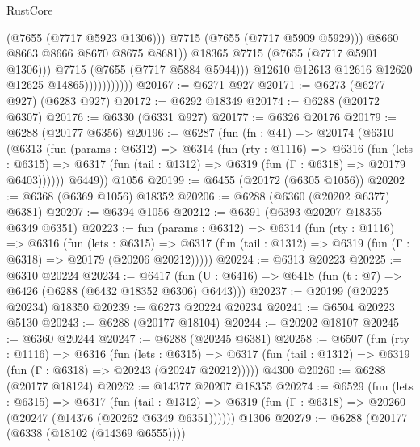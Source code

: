 \begin{lexlean}{RustCore}
\begin{coremodule}
                                      (@7655 (@7717 @5923 @1306)))
                                    @7715
                                    (@7655 (@7717 @5909 @5929)))
                                  @8660
                                  @8663
                                  @8666
                                  @8670
                                  @8675
                                  @8681))
                              @18365
                              @7715
                              (@7655 (@7717 @5901 @1306)))
                            @7715
                            (@7655 (@7717 @5884 @5944)))
                          @12610
                          @12613
                          @12616
                          @12620
                          @12625
                          @14865)))))))))))
@20167 := @6271 @927
@20171 := @6273 (@6277 @927) (@6283 @927)
@20172 := @6292 @18349
@20174 := @6288 (@20172 @6307)
@20176 := @6330 (@6331 @927)
@20177 := @6326 @20176
@20179 := @6288 (@20177 @6356)
@20196 := @6287
    (fun (fn : @41) =>
    @20174
      (@6310
        (@6313
          (fun (params : @6312) =>
          @6314
            (fun (rty : @1116) =>
            @6316
              (fun (lets : @6315) =>
              @6317 (fun (tail : @1312) => @6319 (fun (Γ : @6318) => @20179 @6403))))))
        @6449))
    @1056
@20199 := @6455 (@20172 (@6305 @1056))
@20202 := @6368 (@6369 @1056) @18352
@20206 := @6288 (@6360 (@20202 @6377) @6381)
@20207 := @6394 @1056
@20212 := @6391 (@6393 @20207 @18355 @6349 @6351)
@20223 := fun (params : @6312) =>
  @6314
    (fun (rty : @1116) =>
    @6316
      (fun (lets : @6315) =>
      @6317 (fun (tail : @1312) => @6319 (fun (Γ : @6318) => @20179 (@20206 @20212)))))
@20224 := @6313 @20223
@20225 := @6310 @20224
@20234 := @6417
    (fun (U : @6416) => @6418 (fun (t : @7) => @6426 (@6288 (@6432 @18352 @6306) @6443)))
@20237 := @20199 (@20225 @20234) @18350
@20239 := @6273 @20224 @20234
@20241 := @6504 @20223 @5130
@20243 := @6288 (@20177 @18104)
@20244 := @20202 @18107
@20245 := @6360 @20244
@20247 := @6288 (@20245 @6381)
@20258 := @6507
    (fun (rty : @1116) =>
    @6316
      (fun (lets : @6315) =>
      @6317 (fun (tail : @1312) => @6319 (fun (Γ : @6318) => @20243 (@20247 @20212)))))
    @4300
@20260 := @6288 (@20177 @18124)
@20262 := @14377 @20207 @18355
@20274 := @6529
    (fun (lets : @6315) =>
    @6317
      (fun (tail : @1312) =>
      @6319 (fun (Γ : @6318) => @20260 (@20247 (@14376 (@20262 @6349 @6351))))))
    @1306
@20279 := @6288 (@20177 (@6338 (@18102 (@14369 @6555))))

\end{coremodule}
\end{lexlean}
